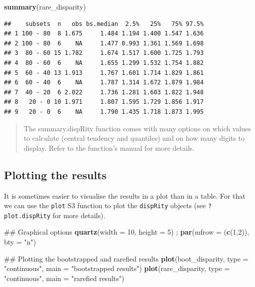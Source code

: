 \documentclass[]{book}
\newenvironment{Shaded}{\begin{snugshade}}{\end{snugshade}}
\newcommand{\KeywordTok}[1]{\textcolor[rgb]{0.13,0.29,0.53}{\textbf{#1}}}
\newcommand{\DataTypeTok}[1]{\textcolor[rgb]{0.13,0.29,0.53}{#1}}
\newcommand{\DecValTok}[1]{\textcolor[rgb]{0.00,0.00,0.81}{#1}}
\newcommand{\StringTok}[1]{\textcolor[rgb]{0.31,0.60,0.02}{#1}}
\newcommand{\NormalTok}[1]{#1}
\theoremstyle{definition}
\theoremstyle{definition}
\theoremstyle{definition}
\theoremstyle{remark}
\begin{document}
\begin{Shaded}
\begin{Highlighting}[]
\KeywordTok{summary}\NormalTok{(rare_disparity)}
\end{Highlighting}
\end{Shaded}

\begin{verbatim}
##    subsets  n   obs bs.median  2.5%   25%   75% 97.5%
## 1 100 - 80  8 1.675     1.484 1.194 1.400 1.547 1.636
## 2 100 - 80  6    NA     1.477 0.993 1.361 1.569 1.698
## 3  80 - 60 15 1.782     1.674 1.517 1.600 1.725 1.793
## 4  80 - 60  6    NA     1.655 1.299 1.532 1.754 1.882
## 5  60 - 40 13 1.913     1.767 1.601 1.714 1.829 1.861
## 6  60 - 40  6    NA     1.787 1.314 1.672 1.879 1.984
## 7  40 - 20  6 2.022     1.736 1.281 1.603 1.822 1.948
## 8   20 - 0 10 1.971     1.807 1.595 1.729 1.856 1.917
## 9   20 - 0  6    NA     1.790 1.435 1.718 1.873 1.995
\end{verbatim}

\begin{quote}
The summary.dispRity function comes with many options on which values to
calculate (central tendency and quantiles) and on how many digits to
display. Refer to the function's manual for more details.
\end{quote}

\subsection{Plotting the results}\label{plotting-the-results}

It is sometimes easier to visualise the results in a plot than in a
table. For that we can use the \texttt{plot} S3 function to plot the
\texttt{dispRity} objects (see \texttt{?plot.dispRity} for more
details).

\begin{Shaded}
\begin{Highlighting}[]
\NormalTok{## Graphical options}
\KeywordTok{quartz}\NormalTok{(}\DataTypeTok{width =} \DecValTok{10}\NormalTok{, }\DataTypeTok{height =} \DecValTok{5}\NormalTok{) ; }\KeywordTok{par}\NormalTok{(}\DataTypeTok{mfrow =}\NormalTok{ (}\KeywordTok{c}\NormalTok{(}\DecValTok{1}\NormalTok{,}\DecValTok{2}\NormalTok{)), }\DataTypeTok{bty =} \StringTok{"n"}\NormalTok{)}

\NormalTok{## Plotting the bootstrapped and rarefied results}
\KeywordTok{plot}\NormalTok{(boot_disparity, }\DataTypeTok{type =} \StringTok{"continuous"}\NormalTok{, }\DataTypeTok{main =} \StringTok{"bootstrapped results"}\NormalTok{)}
\KeywordTok{plot}\NormalTok{(rare_disparity, }\DataTypeTok{type =} \StringTok{"continuous"}\NormalTok{, }\DataTypeTok{main =} \StringTok{"rarefied results"}\NormalTok{)}
\end{Highlighting}
\end{Shaded}
\end{document}
